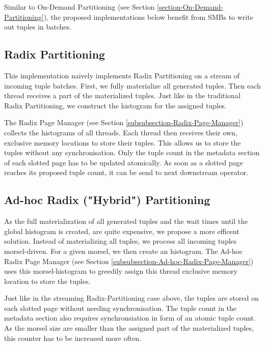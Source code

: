 Similar to On-Demand Partitioning (see Section \ref{section-On-Demand-Partitioning}), the proposed implementations below benefit from \acfp{SMB} to write out tuples in batches.
\subsection{Radix Partitioning}
This implementation naively implements Radix Partitioning on a stream of incoming tuple batches.
First, we fully materialize all generated tuples.
Then each thread receives a part of the materialized tuples.
Just like in the traditional Radix Partitioning, we construct the histogram for the assigned tuples.

The Radix Page Manager (see Section \ref{subsubsection-Radix-Page-Manager}) collects the histograms of all threads.
Each thread then receives their own, exclusive memory locations to store their tuples.
This allows us to store the tuples without any synchronisation.
Only the tuple count in the metadata section of each slotted page has to be updated atomically.
As soon as a slotted page reaches its proposed tuple count, it can be send to next downstream operator.

\subsection{Ad-hoc Radix ("Hybrid") Partitioning}
As the full materialization of all generated tuples and the wait times until the global histogram is created, are quite expensive, we propose a more efficent solution.
Instead of materializing all tuples, we process all incoming tuples morsel-driven.
For a given morsel, we then create an histogram.
The Ad-hoc Radix Page Manager (see Section \ref{subsubsection-Ad-hoc-Radix-Page-Manager}) uses this morsel-histogram to greedily assign this thread exclusive memory location to store the tuples.

Just like in the streaming Radix-Partitioning case above, the tuples are stored on each slotted page without needing synchronisation.
The tuple count in the metadata section also requires synchronsiation in form of an atomic tuple count.
As the morsel size are smaller than the assigned part of the materialized tuples, this counter has to be increased more often.


